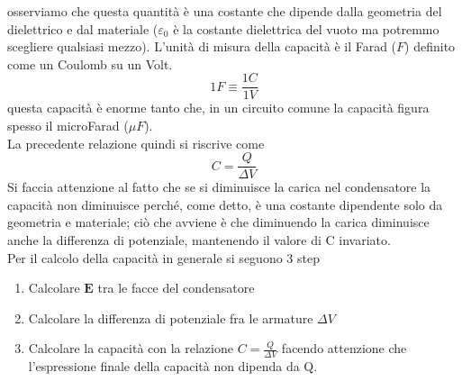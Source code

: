 \documentclass[
10pt, %
a4paper, %
oneside, %
headinclude,footinclude, %
BCOR5mm, %
]{scrartcl}
\begin{document}
osserviamo che questa quantità è una costante che dipende dalla geometria del dielettrico e dal materiale ($\varepsilon_0$ è la costante dielettrica del vuoto ma potremmo scegliere qualsiasi mezzo). L'unità di misura della capacità è il Farad (\(F\)) definito come un Coulomb su un Volt. 
\[1F \equiv \frac{1C}{1V}\]
questa capacità è enorme tanto che, in un circuito comune la capacità figura spesso il microFarad (\(\mu F\)).\\
La precedente relazione quindi si riscrive come
\[C = \frac{Q}{\Delta V}\]
Si faccia attenzione al fatto che se si diminuisce la carica nel condensatore la capacità non diminuisce perché, come detto, è una costante dipendente solo da geometria e materiale; ciò che avviene è che diminuendo la carica diminuisce anche la differenza di potenziale, mantenendo il valore di C invariato.\\
Per il calcolo della capacità in generale si seguono 3 step
\begin{enumerate}
\item Calcolare $\mathbf{E}$ tra le facce del condensatore
\item Calcolare la differenza di potenziale fra le armature \(\Delta V\)
\item Calcolare la capacità con la relazione \(C=\frac{Q}{\Delta V}\) facendo attenzione che l'espressione finale della capacità non dipenda da Q. 
\end{enumerate} 
\end{document}
